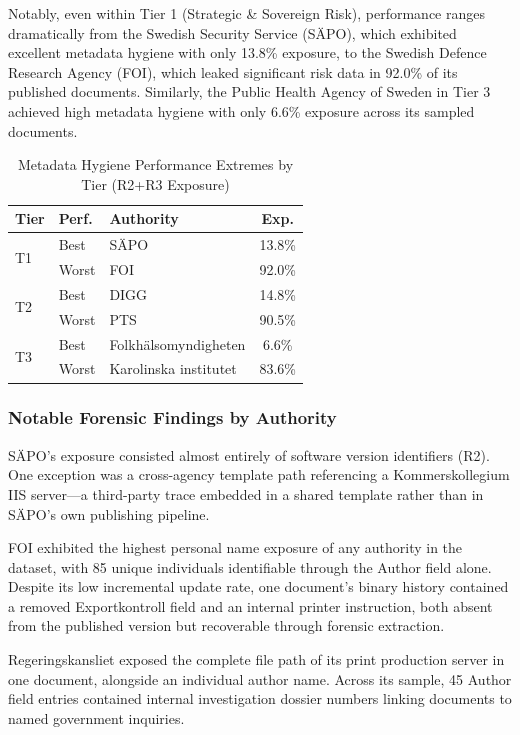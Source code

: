 \documentclass[conference]{IEEEtran}
\begin{document}
Notably, even within Tier 1 (Strategic \& Sovereign Risk), performance ranges dramatically from the Swedish Security Service (SÄPO), which exhibited excellent metadata hygiene with only 13.8\% exposure, to the Swedish Defence Research Agency (FOI), which leaked significant risk data in 92.0\% of its published documents. Similarly, the Public Health Agency of Sweden in Tier 3 achieved high metadata hygiene with only 6.6\% exposure across its sampled documents.

\begin{table}[htbp]
\centering
\caption{Metadata Hygiene Performance Extremes by Tier (R2+R3 Exposure)}
\label{tab:auth_extremes}
{\small
\begin{tabular}{|l|l|p{3.2cm}|c|}
\hline
\textbf{Tier} & \textbf{Perf.} & \textbf{Authority} & \textbf{Exp.} \\
\hline
\multirow{2}{*}{T1} & Best & SÄPO & 13.8\%  \\
 & Worst & FOI & 92.0\% \\
\hline
\multirow{2}{*}{T2} & Best & DIGG & 14.8\%  \\
 & Worst & PTS & 90.5\%  \\
\hline
\multirow{2}{*}{T3} & Best & Folkhälsomyndigheten & 6.6\% \\
 & Worst & Karolinska institutet & 83.6\% \\
\hline
\end{tabular}
}
\end{table}

\subsubsection{Notable Forensic Findings by Authority}
S\"APO's exposure consisted almost entirely of software version identifiers (R2). One exception was a cross-agency template path referencing a Kommerskollegium IIS server---a third-party trace embedded in a shared template rather than in S\"APO's own publishing pipeline.

FOI exhibited the highest personal name exposure of any authority in the dataset, with 85 unique individuals identifiable through the Author field alone. Despite its low incremental update rate, one document's binary history contained a removed Exportkontroll field and an internal printer instruction, both absent from the published version but recoverable through forensic extraction.

Regeringskansliet exposed the complete file path of its print production server in one document, alongside an individual author name. Across its sample, 45 Author field entries contained internal investigation dossier numbers linking documents to named government inquiries.
\end{document}
